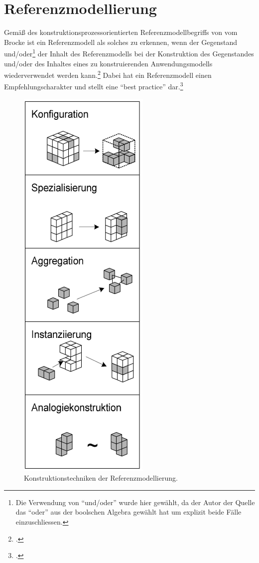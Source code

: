 \section{Referenzmodellierung}\label{theorie:referenzmodellierung}
Gemäß des konstruktionsprozessorientierten Referenzmodellbegriffs von vom Brocke ist ein Referenzmodell als solches zu erkennen, wenn der Gegenstand und/oder\footnote{Die Verwendung von \enquote{und/oder} wurde hier gewählt, da der Autor der Quelle das \enquote{oder} aus der boolschen Algebra gewählt hat um explizit beide Fälle einzuschliessen.} der Inhalt des Referenzmodells bei der Konstruktion des Gegenstandes und/oder des Inhaltes eines zu konstruierenden Anwendungsmodells wiederverwendet werden kann.\footcite[Vgl.][34]{vomBrocke.2003} Dabei hat ein Referenzmodell einen Empfehlungscharakter und stellt eine \enquote{best practice} dar.\footcite[Vgl.][31]{vomBrocke.2003} 



\begin{figure}[H]
\centering
\includegraphics[height=0.45\textheight]{graphics/anwendung-referenzmodelle.pdf}
\caption[Konstruktionstechniken der Referenzmodellierung]{Konstruktionstechniken der Referenzmodellierung.\footnotemark}
\label{abb:KonstruktionstechnikenRefMod}
\end{figure}

